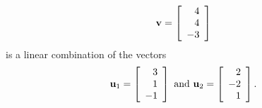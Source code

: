 \documentclass{ximera}
\author{Zack Reed}
\begin{document}
\begin{problem}

\begin{equation*}
  \vect{v}= \startmat{r}
    4 \\
    4 \\
    -3
  \stopmat
\end{equation*}
is a linear combination of the vectors
\begin{equation*}
  \vect{u}_1 = \startmat{r}
    3 \\
    1 \\
    -1
  \stopmat
  \quad\mbox{and}\quad
  \vect{u}_2 =
  \startmat{r}
    2 \\
    -2 \\
    1
  \stopmat.
\end{equation*}

\end{problem}
\end{document}
